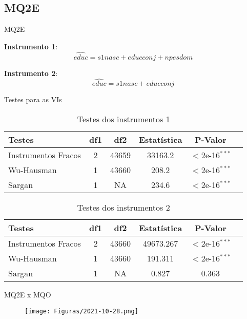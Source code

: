 \documentclass[xcolor={dvipsnames}]{beamer}
\begin{document}
\subsection{MQ2E}
\begin{frame}{MQ2E}
    \item \textbf{Instrumento 1}:
    \begin{equation}
        \widehat{educ} = s1nasc + educconj + npesdom 
    \end{equation} 
    \item \textbf{Instrumento 2}:
    \begin{equation}
        \widehat{educ} = s1nasc + educconj 
    \end{equation} 
\end{frame}

\begin{frame}{Testes para as VIs}
\begin{table}[H]
    \caption{Testes dos instrumentos 1}
    \centering
    \begin{tabular}{lccccc}\hline
    \textbf{Testes}     & df1 & df2   & Estatística & P-Valor \\\hline
    Instrumentos Fracos & 2   & 43659 & 33163.2     & $<$2e-16$^{***}$\\
    Wu-Hausman          & 1   & 43660 & 208.2       & $<$2e-16$^{***}$ \\
    Sargan              & 1   & NA    & 234.6       & $<$2e-16$^{***}$ \\\hline
    \end{tabular}
\end{table}

\begin{table}[H]
    \caption{Testes dos instrumentos 2}
    \centering
    \begin{tabular}{lccccc}\hline
    \textbf{Testes}     & df1 & df2   & Estatística & P-Valor \\\hline
    Instrumentos Fracos & 2   & 43660 & 49673.267   & $<$2e-16$^{***}$\\
    Wu-Hausman          & 1   & 43660 & 191.311     & $<$2e-16$^{***}$ \\
    Sargan              & 1   & NA    & 0.827       & 0.363 \\\hline
    \end{tabular}
\end{table}
\end{frame}

\begin{frame}{MQ2E x MQO}
    \begin{figure}
        \centering
        \texttt{[image: Figuras/2021-10-28.png]}
    \end{figure}
\end{frame}
\end{document}
